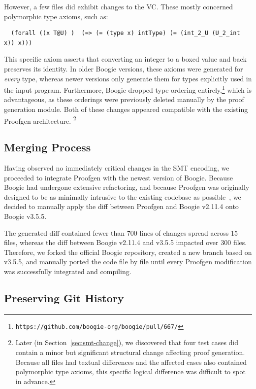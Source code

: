 \documentclass[11pt]{article}
\begin{document}
However, a few files did exhibit changes to the VC.
These mostly concerned polymorphic type axioms, such as:

\begin{verbatim}
  (forall ((x T@U) )  (=> (= (type x) intType) (= (int_2_U (U_2_int x)) x)))
\end{verbatim}

This specific axiom asserts that converting an integer to a boxed value and back preserves its identity.
In older Boogie versions, these axioms were generated for \emph{every} type, whereas newer versions only generate them for types explicitly used in the input program.
Furthermore, Boogie dropped type ordering entirely,\footnote{\texttt{https://github.com/boogie-org/boogie/pull/667/}}
which is advantageous, as these orderings were previously deleted manually by the proof generation module.
Both of these changes appeared compatible with the existing Proofgen architecture.
\footnote{Later (in Section~\ref{sec:smt-change}), we discovered that four test cases did contain a minor but significant structural change affecting proof generation. Because all files had textual differences and the affected cases also contained polymorphic type axioms, this specific logical difference was difficult to spot in advance.}

\subsection{Merging Process}

Having observed no immediately critical changes in the SMT encoding, we proceeded to integrate Proofgen with the newest version of Boogie.
Because Boogie had undergone extensive refactoring, and because Proofgen was originally designed to be as minimally intrusive to the existing codebase as possible~\cite{parthasarathy2021formally},
we decided to manually apply the diff between Proofgen and Boogie v2.11.4 onto Boogie v3.5.5.

The generated diff contained fewer than 700 lines of changes spread across 15 files,
whereas the diff between Boogie v2.11.4 and v3.5.5 impacted over 300 files.
Therefore, we forked the official Boogie repository, created a new branch based on v3.5.5,
and manually ported the code file by file until every Proofgen modification was successfully integrated and compiling.

\subsection{Preserving Git History}
\end{document}
